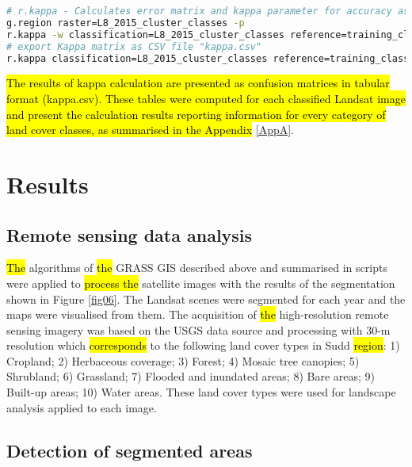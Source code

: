 \documentclass[sustainability,article,submit,pdftex,moreauthors]{Definitions/mdpi}
\begin{document}
\begin{lstlisting}[language=bash,caption=GRASS GIS code for computing the error matrix and kappa parameters for accuracy assessment of Landsat classification,style=mystyle,label={lst06}]
# r.kappa - Calculates error matrix and kappa parameter for accuracy assessment of classification result.
g.region raster=L8_2015_cluster_classes -p
r.kappa -w classification=L8_2015_cluster_classes reference=training_classes_Sudd
# export Kappa matrix as CSV file "kappa.csv"
r.kappa classification=L8_2015_cluster_classes reference=training_classes_Sudd output=kappa.csv -m -h --overwrite
\end{lstlisting}

\hl{The results of kappa calculation are presented as confusion matrices in tabular format (kappa.csv). These tables were computed for each classified Landsat image and present the calculation results reporting information for every category of land cover classes, as summarised in the Appendix }\ref{AppA}. 

\section{Results}

\subsection{Remote sensing data analysis}
\hl{The }algorithms of \hl{the }GRASS GIS described above and summarised in scripts were applied to \hl{process the }satellite images with the results of the segmentation shown in Figure \ref{fig06}. The Landsat scenes were segmented for each year and the maps were visualised from them. The acquisition of \hl{the }high-resolution remote sensing imagery was based on the USGS data source and processing with 30-m resolution which \hl{corresponds} to the following land cover types in Sudd \hl{region}: 1) Cropland; 2) Herbaceous coverage; 3) Forest; 4) Mosaic tree canopies; 5) Shrubland; 6) Grassland; 7) Flooded and inundated areas; 8) Bare areas; 9) Built-up areas; 10) Water areas. These land cover types were used for landscape analysis applied to each image.

\subsection{Detection of segmented areas}
\end{document}
